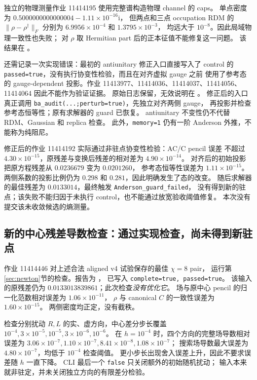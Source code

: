 \documentclass[11pt]{article}
\newcommand{\code}[1]{{\small\texttt{#1}}}
\begin{document}
独立的物理测量作业 11414195 使用完整谱构造物理 channel 的 caps。
单点密度为 $0.5000000000000004-1.11\times10^{-16}\mathrm{i}$，
但两点和三点 occupation RDM 的 $\|\rho-\rho^\dagger\|_F$
分别为 $6.9956\times10^{-4}$ 和 $1.3795\times10^{-3}$，
均远大于 $10^{-8}$。因此局域物理一致性也失败；
对 $\rho$ 取 Hermitian part 后的正本征值不能修复这一问题。
该结果在 。

还需记录一次实现错误：最初的 antiunitary 修正入口直接写入了 control 的
\code{passed=true}，没有执行协变性检验，而且在对齐虚拟 gauge 之前
使用了参考态的 gauge-dependent 投影。作业
11413977、11414036、11414037、11414056、11414064 因此不能作为验证证据。
原始日志保留，无效说明在
。
修正后的入口真正调用 \code{ba\_audit(...;perturb=true)}，先独立对齐两侧 gauge，
再投影并检查参考态恒等性；原有求解器的 guard 已恢复。
antiunitary 不变性仍不代替 RDM、Gaussian 和 replica 检查。
此外，\code{memory=1} 仍有一阶 Anderson 外推，不能称为纯阻尼。

修正后的作业 11414192 实际通过非驻点协变性检验：AC/C pencil 误差
不超过 $4.30\times10^{-15}$，原残差与变换后残差的相对差为 $4.90\times10^{-14}$。
对齐后的初始投影把原方程残差从 $0.0236679$ 变为 $0.0201260$，
参考态恒等性误差为 $1.11\times10^{-15}$。
两侧系数的投影比例仍为 $0.298$ 和 $0.281$，因此明确发生了态的改变。
随后求解器的最佳残差为 $0.0133014$，最终触发 \code{Anderson\_guard\_failed}，
没有得到新的驻点；该失败不能归因于未执行 control，也不能通过放宽验收阈值修复。
本次没有提交该未收敛候选的熵测量。

\subsection{新的中心残差导数检查：通过实现检查，尚未得到新驻点}
作业 11414446 对上述合法 aligned v4 试验保存的最佳 $\chi=8$ pair，
运行第\ref{sec:newton}节的检查。报告为
，
已写入 \code{complete=true, passed=true}。
该输入的原残差仍为 $0.0133013839861$；此次检查\emph{没有优化它}。
场与原中心 pencil 的归一化范数相对误差为 $1.06\times10^{-11}$，
$\rho$ 与 canonical $C$ 的一致性误差为 $1.60\times10^{-15}$。
两侧密度均正定，没有截秩。

检查分别扰动 $R,L$ 的实、虚方向，中心差分步长覆盖
$10^{-4},3\times10^{-5},10^{-5},3\times10^{-6},10^{-6}$。
在 $h=10^{-4}$ 时，四个方向的完整场导数相对误差为
$3.06\times10^{-7},1.10\times10^{-7},8.41\times10^{-8},1.08\times10^{-7}$；
搜索场导数最大误差为 $4.80\times10^{-7}$，均低于 $10^{-4}$ 检查阈值。
更小步长出现舍入误差上升，因此不要求误差随 $h$ 一直下降。
CLI 最后一个 \code{false} 只关闭额外的初始随机扰动；
输入本来就非驻定，并未关闭独立方向的有限差分检验。
\end{document}

